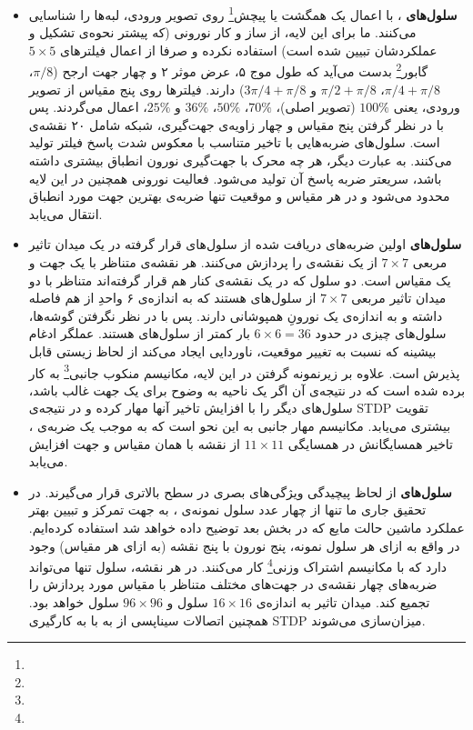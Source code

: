 \begin{itemize}
\item
\textbf{سلول‌های }، با اعمال یک همگشت یا پیچش\footnote{} روی تصویر ورودی، لبه‌ها را شناسایی می‌کنند. ما برای این لایه، از ساز و کار نورونی (که پیشتر نحوه‌ی تشکیل و عملکردشان تبیین شده است) استفاده نکرده و صرفا از اعمال فیلتر‌های $5\times5$ گابور\footnote{} بدست می‌آید که طول موج ۵، عرض موثر ۲ و چهار جهت ارجح ($\pi/8$، $\pi/4+\pi/8$، $\pi/2+\pi/8$ و $3\pi/4+\pi/8$) دارند. فیلتر‌ها روی پنج مقیاس از تصویر ورودی، یعنی $100\%$ (تصویر اصلی)، $70\%$، $50\%$، $36\%$ و $25\%$، اعمال می‌گردند. پس با در نظر گرفتن پنج مقیاس و چهار زاویه‌ی جهت‌گیری، شبکه شامل ۲۰ نقشه‌ی  است. سلول‌های  ضربه‌هایی با تاخیر متناسب با معکوس شدت پاسخ فیلتر تولید می‌کنند. به عبارت دیگر، هر چه محرک با جهت‌گیری نورون انطباق بیشتری داشته باشد، سریعتر ضربه پاسخ آن تولید می‌شود. فعالیت نورونی همچنین در این لایه محدود می‌شود و در هر مقیاس و موقعیت تنها ضربه‌ی بهترین جهت مورد انطباق انتقال می‌یابد. 

\item
\textbf{سلول‌های } اولین ضربه‌های دریافت شده از سلول‌های  قرار گرفته در یک میدان تاثیر مربعی $7\times7$ از یک نقشه‌ی  را پردازش می‌کنند. هر نقشه‌ی  متناظر با یک جهت و یک مقیاس است. دو سلول  که در یک نقشه‌ی  کنار هم قرار گرفته‌اند متناظر با دو میدان تاثیر مربعی $7\times7$ از سلول‌های  هستند که به اندازه‌ی ۶ واحدِ  از هم فاصله داشته و به اندازه‌ی یک نورونِ  همپوشانی دارند. پس با در نظر نگرفتن گوشه‌ها، سلول‌های  چیزی در حدود $6\times6=36$ بار کمتر از سلول‌های  هستند.
عملگر ادغام بیشینه که نسبت به تغییر موقعیت، ناوردایی ایجاد می‌کند از لحاظ زیستی قابل پذیرش است\cite{riesenhuber1999hierarchical}. 
علاوه بر زیرنمونه گرفتن در این لایه، مکانیسم منکوب جانبی\footnote{} به کار برده شده است که در نتیجه‌ی آن اگر یک ناحیه به وضوح برای یک جهت غالب باشد، سلول‌های دیگر را با افزایش تاخیر آنها مهار کرده و در نتیجه‌ی STDP تقویت بیشتری می‌یابد. مکانیسم مهار جانبی به این نحو است که به موجب یک ضربه‌ی ، تاخیر همسایگانش در همسایگی $11\times11$ از نقشه با همان مقیاس و جهت افزایش می‌یابد. 

\item
\textbf{سلول‌های } از لحاظ پیچیدگی ویژگی‌های بصری در سطح بالاتری قرار می‌گیرند. در تحقیق جاری ما تنها از چهار عدد سلول نمونه‌ی ، به جهت تمرکز و تبیین بهتر عملکرد ماشین حالت مایع که در بخش بعد توضیح داده خواهد شد استفاده کرده‌ایم. در واقع به ازای هر سلول نمونه، پنج نورون با پنج نقشه (به ازای هر مقیاس) وجود دارد که با مکانیسم اشتراک وزنی\footnote{} کار می‌کنند. در هر نقشه، سلول  تنها می‌تواند ضربه‌های چهار نقشه‌ی  در جهت‌های مختلف متناظر با مقیاس مورد پردازش را تجمیع کند. میدان تاثیر به اندازه‌ی $16\times16$ سلول  و $96\times96$ سلول  خواهد بود. همچنین اتصالات سیناپسی از  به  با به کارگیری STDP میزان‌سازی می‌شوند. 


\end{itemize}

